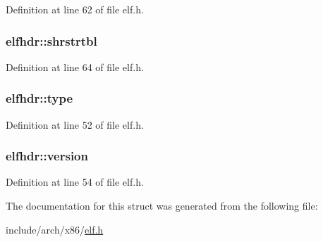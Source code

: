 \-Definition at line 62 of file elf.\-h.

\hypertarget{structelfhdr_a45fd0b68634a61bf55618c95810aeecb}{
\subsubsection[{shrstrtbl}]{ {\bf elfhdr\-::shrstrtbl}}}\label{structelfhdr_a45fd0b68634a61bf55618c95810aeecb}


\-Definition at line 64 of file elf.\-h.

\hypertarget{structelfhdr_adb5bfdc812a00aa5e6ab031f24a91698}{
\subsubsection[{type}]{ {\bf elfhdr\-::type}}}\label{structelfhdr_adb5bfdc812a00aa5e6ab031f24a91698}


\-Definition at line 52 of file elf.\-h.

\hypertarget{structelfhdr_adb2ce1c30d98c0be0529bcd30ba26022}{
\subsubsection[{version}]{ {\bf elfhdr\-::version}}}\label{structelfhdr_adb2ce1c30d98c0be0529bcd30ba26022}


\-Definition at line 54 of file elf.\-h.



\-The documentation for this struct was generated from the following file\-:\begin{DoxyCompactItemize}
\item 
include/arch/x86/\hyperlink{elf_8h}{elf.\-h}\end{DoxyCompactItemize}
